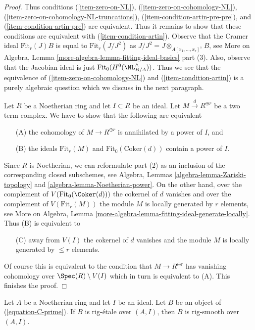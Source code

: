 \begin{proof}
\medskip\noindent
Thus conditions
(\ref{item-zero-on-NL}),
(\ref{item-zero-on-cohomology-NL}),
(\ref{item-zero-on-cohomology-NL-truncations}),
(\ref{item-condition-artin-pre-pre}), and
(\ref{item-condition-artin-pre}) are equivalent.
Thus it remains to show that these conditions are
equivalent with (\ref{item-condition-artin}).
Observe that the Cramer ideal $\text{Fit}_r(J) B$ is
equal to $\text{Fit}_r(J/J^2)$ as
$J/J^2 = J \otimes_{A[x_1, \ldots, x_r]^\wedge} B$, see
More on Algebra, Lemma \ref{more-algebra-lemma-fitting-ideal-basics} part (3).
Also, observe that the Jacobian ideal is just
$\text{Fit}_0(H^0(\NL_{B/A}^\wedge))$.
Thus we see that the equivalence of
(\ref{item-zero-on-cohomology-NL}) and (\ref{item-condition-artin})
is a purely algebraic question which we discuss in the next paragraph.

\medskip\noindent
Let $R$ be a Noetherian ring and let $I \subset R$ be an ideal.
Let $M \xrightarrow{d} R^{\oplus r}$ be a two term complex.
We have to show that the following are equivalent
\begin{enumerate}
\item[(A)] the cohomology of $M \to R^{\oplus r}$ is annihilated by a power
of $I$, and
\item[(B)] the ideals $\text{Fit}_r(M)$ and $\text{Fit}_0(\text{Coker}(d))$
contain a power of $I$.
\end{enumerate}
Since $R$ is Noetherian, we can reformulate part (2) as an inclusion
of the corresponding closed subschemes, see Algebra, Lemmas
\ref{algebra-lemma-Zariski-topology} and \ref{algebra-lemma-Noetherian-power}.
On the other hand, over the complement of $V(\text{Fit}_0(\Coker(d)))$
the cokernel of $d$ vanishes and over the complement of
$V(\text{Fit}_r(M))$ the module $M$ is locally generated by $r$
elements, see
More on Algebra, Lemma \ref{more-algebra-lemma-fitting-ideal-generate-locally}.
Thus (B) is equivalent to
\begin{enumerate}
\item[(C)] away from $V(I)$ the cokernel of $d$ vanishes and
the module $M$ is locally generated by $\leq r$ elements.
\end{enumerate}
Of course this is equivalent to the condition that $M \to R^{\oplus r}$
has vanishing cohomology over $\Spec(R) \setminus V(I)$ which in turn
is equivalent to (A). This finishes the proof.
\end{proof}

\begin{lemma}
\label{lemma-rig-etale-rig-smooth}
Let $A$ be a Noetherian ring and let $I$ be an ideal.
Let $B$ be an object of (\ref{equation-C-prime}).
If $B$ is rig-\'etale over $(A, I)$, then $B$ is rig-smooth over $(A, I)$.
\end{lemma}

